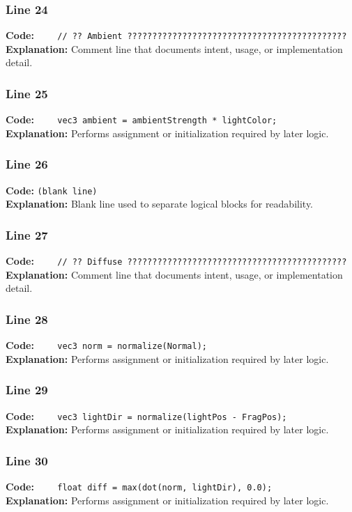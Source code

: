 \documentclass[11pt,a4paper]{article}
\begin{document}
\subsubsection*{Line 24}
\textbf{Code:} \verb|    // ?? Ambient ????????????????????????????????????????????|\\
\textbf{Explanation:} Comment line that documents intent, usage, or implementation detail.

\subsubsection*{Line 25}
\textbf{Code:} \verb|    vec3 ambient = ambientStrength * lightColor;|\\
\textbf{Explanation:} Performs assignment or initialization required by later logic.

\subsubsection*{Line 26}
\textbf{Code:} \texttt{(blank line)}\\
\textbf{Explanation:} Blank line used to separate logical blocks for readability.

\subsubsection*{Line 27}
\textbf{Code:} \verb|    // ?? Diffuse ????????????????????????????????????????????|\\
\textbf{Explanation:} Comment line that documents intent, usage, or implementation detail.

\subsubsection*{Line 28}
\textbf{Code:} \verb|    vec3 norm = normalize(Normal);|\\
\textbf{Explanation:} Performs assignment or initialization required by later logic.

\subsubsection*{Line 29}
\textbf{Code:} \verb|    vec3 lightDir = normalize(lightPos - FragPos);|\\
\textbf{Explanation:} Performs assignment or initialization required by later logic.

\subsubsection*{Line 30}
\textbf{Code:} \verb|    float diff = max(dot(norm, lightDir), 0.0);|\\
\textbf{Explanation:} Performs assignment or initialization required by later logic.
\end{document}
